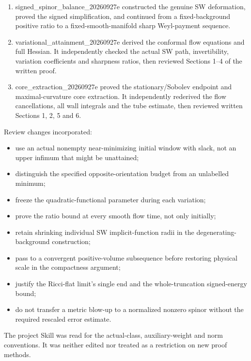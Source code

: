 \documentclass[
  10pt,
]{article}
\providecommand{\tightlist}{%
  \setlength{\itemsep}{0pt}\setlength{\parskip}{0pt}}
\begin{document}
\begin{enumerate}
\def\labelenumi{\arabic{enumi}.}
\tightlist
\item
  signed\_spinor\_balance\_20260927e constructed the genuine SW
  deformation, proved the signed simplification, and continued from a
  fixed-background positive ratio to a fixed-smooth-manifold sharp
  Weyl-payment sequence.
\item
  variational\_attainment\_20260927e derived the conformal flow
  equations and full Hessian. It independently checked the actual SW
  path, invertibility, variation coefficients and sharpness ratios, then
  reviewed Sections 1--4 of the written proof.
\item
  core\_extraction\_20260927e proved the stationary/Sobolev endpoint and
  maximal-curvature core extraction. It independently rederived the flow
  cancellations, all wall integrals and the tube estimate, then reviewed
  written Sections 1, 2, 5 and 6.
\end{enumerate}

Review changes incorporated:

\begin{itemize}
\tightlist
\item
  use an actual nonempty near-minimizing initial window with slack, not
  an upper infimum that might be unattained;
\item
  distinguish the specified opposite-orientation budget from an
  unlabelled minimum;
\item
  freeze the quadratic-functional parameter during each variation;
\item
  prove the ratio bound at every smooth flow time, not only initially;
\item
  retain shrinking individual SW implicit-function radii in the
  degenerating-background construction;
\item
  pass to a convergent positive-volume subsequence before restoring
  physical scale in the compactness argument;
\item
  justify the Ricci-flat limit's single end and the whole-truncation
  signed-energy bound;
\item
  do not transfer a metric blow-up to a normalized nonzero spinor
  without the required rescaled error estimate.
\end{itemize}

The project Skill was read for the actual-class, auxiliary-weight and
norm conventions. It was neither edited nor treated as a restriction on
new proof methods.
\end{document}
